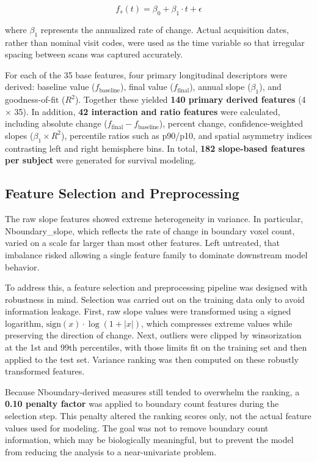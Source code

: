 \documentclass[blue]{ludusofficial}  %
\begin{document}
\begin{equation}
    f_s(t) = \beta_0 + \beta_1 \cdot t + \epsilon
\end{equation}

where $\beta_1$ represents the annualized rate of change. Actual acquisition dates, rather than nominal visit codes, were used as the time variable so that irregular spacing between scans was captured accurately.

For each of the 35 base features, four primary longitudinal descriptors were derived: baseline value ($f_{\text{baseline}}$), final value ($f_{\text{final}}$), annual slope ($\beta_1$), and goodness-of-fit ($R^2$). Together these yielded \textbf{140 primary derived features} (4 $\times$ 35). In addition, \textbf{42 interaction and ratio features} were calculated, including absolute change ($f_{\text{final}} - f_{\text{baseline}}$), percent change, confidence-weighted slopes ($\beta_1 \times R^2$), percentile ratios such as p90/p10, and spatial asymmetry indices contrasting left and right hemisphere bins. In total, \textbf{182 slope-based features per subject} were generated for survival modeling.

\subsection{Feature Selection and Preprocessing}

The raw slope features showed extreme heterogeneity in variance. In particular, Nboundary\_slope, which reflects the rate of change in boundary voxel count, varied on a scale far larger than most other features. Left untreated, that imbalance risked allowing a single feature family to dominate downstream model behavior.

To address this, a feature selection and preprocessing pipeline was designed with robustness in mind. Selection was carried out on the training data only to avoid information leakage. First, raw slope values were transformed using a signed logarithm, $\text{sign}(x) \cdot \log(1 + |x|)$, which compresses extreme values while preserving the direction of change. Next, outliers were clipped by winsorization~\cite{winsorization} at the 1st and 99th percentiles, with those limits fit on the training set and then applied to the test set. Variance ranking was then computed on these robustly transformed features.

Because Nboundary-derived measures still tended to overwhelm the ranking, a \textbf{0.10 penalty factor} was applied to boundary count features during the selection step. This penalty altered the ranking scores only, not the actual feature values used for modeling. The goal was not to remove boundary count information, which may be biologically meaningful, but to prevent the model from reducing the analysis to a near-univariate problem.
\end{document}
